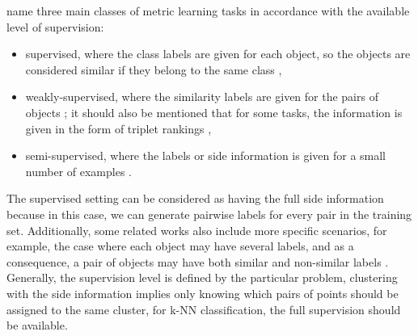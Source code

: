 \citep{BelletHS13} name three main classes of metric learning tasks in accordance with the available level of  supervision: 
\begin{itemize}
    \item supervised, where the class labels are given for each object, so the objects are considered similar if they belong to the same class \citep{globerson2006metric, NIPS2005_2795, weinberger2009distance},
    \item weakly-supervised, where the similarity labels are given for the pairs of objects \citep{hirzer2012person,koestinger2012large,liao2015person}; it should also be mentioned that for some tasks, the information is given in the form of triplet rankings \citep{schultz2004learning}, 
    \item semi-supervised, where the labels or side information is given for a small number of examples \citep{xing2003distance,davis2007information,mignon2012pcca}.
\end{itemize}
The supervised setting can be considered as having the full side information because in this case, we can generate pairwise labels for every pair in the training set. Additionally, some related works also include more specific scenarios, for example, the case where each object may have several labels, and as a consequence, a pair of objects may have both similar and non-similar labels \citep{GoukPC16}. Generally, the supervision level is defined by the particular problem, \eg{} clustering with the side information implies only knowing which pairs of points should be assigned to the same cluster, for k-NN classification, the full supervision should be available.  %

